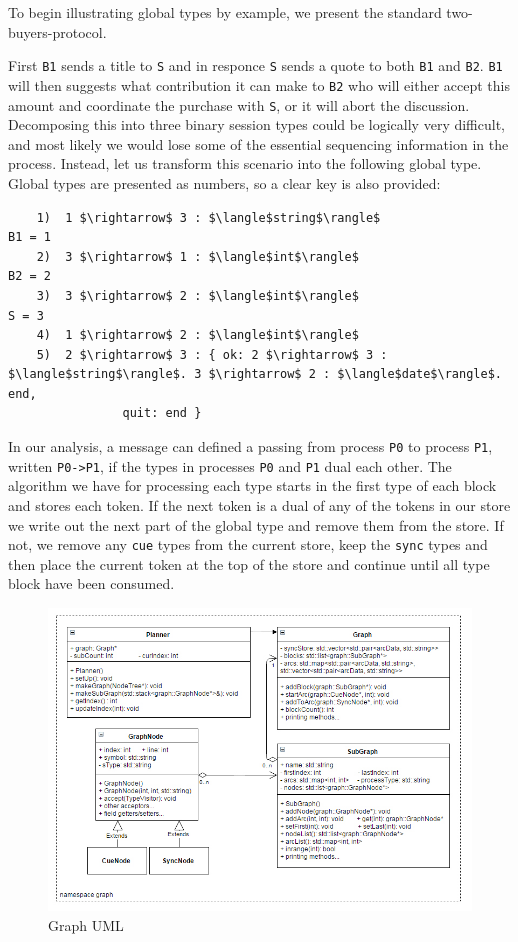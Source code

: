 \documentclass[11pt, abstracton, twoside, titlepage=true]{scrartcl}
\begin{document}
To begin illustrating global types by example, we present the standard 
two-buyers-protocol.

First \texttt{B1} sends a title to \texttt{S} and in responce \texttt{S}
sends a quote to both \texttt{B1} and \texttt{B2}. \texttt{B1} will then
suggests what contribution it can make to \texttt{B2} who will either
accept this amount and coordinate the purchase with \texttt{S}, or it will
abort the discussion. Decomposing this into three binary session types
could be logically very difficult, and most likely we would lose some of
the essential sequencing information in the process. Instead, let us transform
this scenario into the following global type. Global types are presented as
numbers, so a clear key is also provided:
\\
\begin{lstlisting}
    1)  1 $\rightarrow$ 3 : $\langle$string$\rangle$                         B1 = 1
    2)  3 $\rightarrow$ 1 : $\langle$int$\rangle$                            B2 = 2
    3)  3 $\rightarrow$ 2 : $\langle$int$\rangle$                             S = 3
    4)  1 $\rightarrow$ 2 : $\langle$int$\rangle$
    5)  2 $\rightarrow$ 3 : { ok: 2 $\rightarrow$ 3 : $\langle$string$\rangle$. 3 $\rightarrow$ 2 : $\langle$date$\rangle$. end,
                quit: end }
\end{lstlisting}

In our analysis, a message can defined a passing from process \texttt{P0}
to process \texttt{P1}, written \texttt{P0->P1}, if the types in processes 
\texttt{P0} and \texttt{P1} dual each other. The algorithm we have for processing
each type starts in the first type of each block and stores each token. If
the next token is a dual of any of the tokens in our store we write out the
next part of the global type and remove them from the store. If not, we
remove any \texttt{cue} types from the current store, keep the \texttt{sync} 
types and then place the current token at the top of the store and continue 
until all type block have been consumed.

\begin{figure}[h!]
	\centering
	\includegraphics[width=\textwidth]{images/session.jpg}
	\caption{Graph UML} \label{graphUML}
\end{figure}
\end{document}

